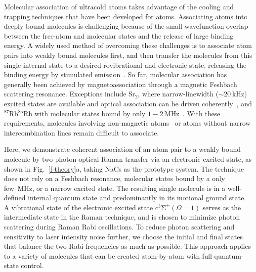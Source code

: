 \documentclass[aps,prx,twocolumn,10pt,superscriptaddress]{revtex4-2}
\begin{document}
Molecular association of ultracold atoms takes advantage of the cooling and trapping techniques
that have been developed for atoms.
Associating atoms into deeply bound molecules is challenging
because of the small wavefunction overlap between the free-atom and molecular states
and the release of large binding energy.
A widely used method of overcoming these challenges is to associate atom pairs
into weakly bound molecules first,
and then transfer the molecules from this single internal state
to a desired rovibrational and electronic state,
releasing the binding energy by stimulated emission~\cite{Danzl2008, Ni2008, Lang2008,
  Takekoshi2014, Molony2014, Park2015, Guo2016, Kondov2019, Voges2020}.
So far, molecular association has generally been achieved by magnetoassociation
through a magnetic Feshbach scattering resonance.
Exceptions include Sr$_2$, where narrow-linewidth ($\sim 20~\mathrm{kHz}$) excited states
are available and optical association can be driven coherently~\cite{Stellmer2012,Reinaudi2012},
and $^{87}$Rb$^{85}$Rb with molecular states bound by only $1-2~\mathrm{MHz}$~\cite{He331}.
With these requirements, molecules involving non-magnetic atoms~\cite{PhysRevX.10.031037}
or atoms without narrow intercombination lines remain difficult to associate.

Here, we demonstrate coherent association of an atom pair to a weakly bound molecule
by two-photon optical Raman transfer via an electronic excited state,
as shown in Fig.~\ref{f-theory}a, taking NaCs as the prototype system.
The technique does not rely on a Feshbach resonance,
molecular states bound by a only few~MHz, or a narrow excited state.
The resulting single molecule is in a well-defined internal quantum state
and predominantly in its motional ground state.
A vibrational state of the electronic excited state $\mathrm{c^3\Sigma^+}(\Omega = 1)$
serves as the intermediate state in the Raman technique,
and is chosen to minimize photon scattering during Raman Rabi oscillations.
To reduce photon scattering and sensitivity to laser intensity noise further,
we choose the initial and final states that balance the two Rabi frequencies as much as possible.
This approach applies to a variety of molecules that can be created atom-by-atom
with full quantum-state control.
\end{document}
